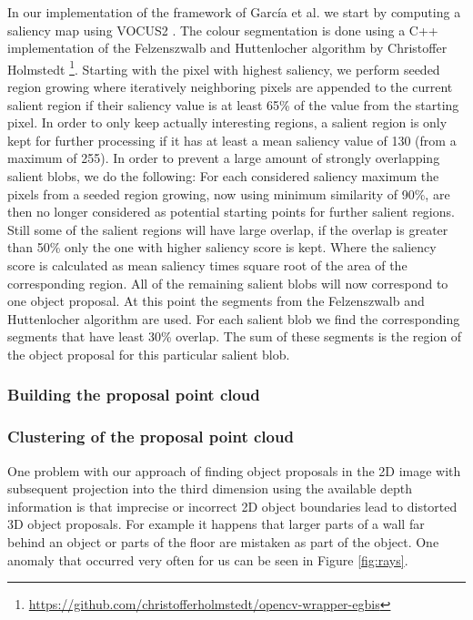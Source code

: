 \documentclass[a4paper,11pt,english]{article}
\begin{document}
In our implementation of the framework of García et al. we start by computing a saliency map using VOCUS2 \cite{frintrop2015traditional}.
The colour segmentation is done using a C++ implementation of the Felzenszwalb and Huttenlocher algorithm \cite{felzenszwalb2004efficient} by Christoffer Holmstedt \footnote{\url{https://github.com/christofferholmstedt/opencv-wrapper-egbis}}.
Starting with the pixel with highest saliency, we perform seeded region growing where iteratively neighboring pixels are appended to the current salient region if their saliency value is at least 65\% of the value from the starting pixel.
In order to only keep actually interesting regions, a salient region is only kept for further processing if it has at least a mean saliency value of 130 (from a maximum of 255).
In order to prevent a large amount of strongly overlapping salient blobs, we do the following: For each considered saliency maximum the pixels from a seeded region growing, now using minimum similarity of 90\%, are then no longer considered as potential starting points for further salient regions.
Still some  of the salient regions will have large overlap, if the overlap is greater than 50\% only the one with higher saliency score is kept.
Where the saliency score is calculated as mean saliency times square root of the area of the corresponding region.
All of the remaining salient blobs will now correspond to one object proposal.
At this point the segments from the Felzenszwalb and Huttenlocher algorithm are used.
For each salient blob we find the corresponding segments that have least 30\% overlap.
The sum of these segments is the region of the object proposal for this particular salient blob.

\subsubsection{Building the proposal point cloud}

\subsubsection{Clustering of the proposal point cloud}
One problem with our approach of finding object proposals in the 2D image with subsequent projection into the third dimension using the available depth information is that imprecise or incorrect 2D object boundaries lead to distorted 3D object proposals.
For example it happens that larger parts of a wall far behind an object or parts of the floor are mistaken as part of the object.
One anomaly that occurred very often for us can be seen in Figure  \ref{fig:rays}.
\end{document}
